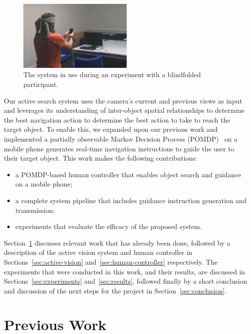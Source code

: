 \documentclass[runningheads]{llncs}
\begin{document}
\begin{figure}
  \centering
  \includegraphics[width=0.5\textwidth]{figures/system_use.png}
  \caption{The system in use during an experiment with a blindfolded participant. }\label{fig:system-in-use}
\end{figure}

Our active search system uses the camera's current and previous views as input and leverages its understanding of inter-object spatial relationships to determine the best navigation action to determine the best action to take to reach the target object.
To enable this, we expanded upon our previous work and implemented a partially observable Markov Decision Process (POMDP)~\cite{bellman1957markovian} on a mobile phone generates real-time navigation instructions to guide the user to their target object.
This work makes the following contributions:

\begin{itemize}
  \item a POMDP-based human controller that enables object search and guidance on a mobile phone;
  \item a complete system pipeline that includes guidance instruction generation and transmission;
  \item experiments that evaluate the efficacy of the proposed system.
\end{itemize}

Section~\ref{sec:previous-work} discusses relevant work that has already been done, followed by a description of the active vision system and human controller in Sections~\ref{sec:active-vision} and~\ref{sec:human-controller} respectively. 
The experiments that were conducted in this work, and their results, are discussed in Sections~\ref{sec:experiments} and~\ref{sec:results}, followed finally by a short conclusion and discussion of the next steps for the project in Section~\ref{sec:conclusion}.

\section{Previous Work}\label{sec:previous-work}
\end{document}
